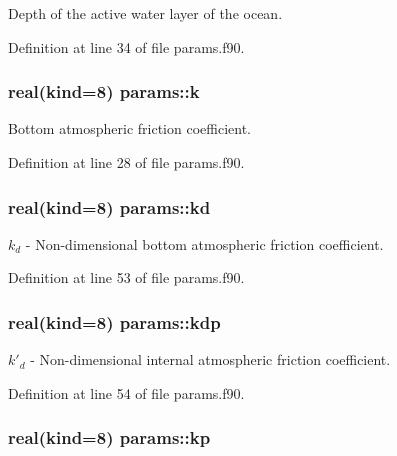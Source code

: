 Depth of the active water layer of the ocean. 



Definition at line 34 of file params.\-f90.

\hypertarget{classparams_a6f40b299d2e21a177bf86afe5b06f790}{
\subsubsection[{k}]{\setlength{\rightskip}{0pt plus 5cm}real(kind=8) params\-::k}}\label{classparams_a6f40b299d2e21a177bf86afe5b06f790}


Bottom atmospheric friction coefficient. 



Definition at line 28 of file params.\-f90.

\hypertarget{classparams_ae9bae2195091caeb7918dcbc3e57f109}{
\subsubsection[{kd}]{\setlength{\rightskip}{0pt plus 5cm}real(kind=8) params\-::kd}}\label{classparams_ae9bae2195091caeb7918dcbc3e57f109}


$k_d$ -\/ Non-\/dimensional bottom atmospheric friction coefficient. 



Definition at line 53 of file params.\-f90.

\hypertarget{classparams_a764d9607a4fdabf5e51f36e90fd7e568}{
\subsubsection[{kdp}]{\setlength{\rightskip}{0pt plus 5cm}real(kind=8) params\-::kdp}}\label{classparams_a764d9607a4fdabf5e51f36e90fd7e568}


$k'_d$ -\/ Non-\/dimensional internal atmospheric friction coefficient. 



Definition at line 54 of file params.\-f90.

\hypertarget{classparams_a7474ac35238cf6acd2b02e7e6261b41d}{
\subsubsection[{kp}]{\setlength{\rightskip}{0pt plus 5cm}real(kind=8) params\-::kp}}\label{classparams_a7474ac35238cf6acd2b02e7e6261b41d}


